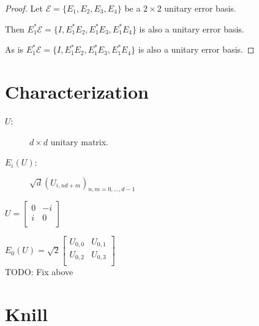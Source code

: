 \documentclass{iansnotes}
\begin{document}
\begin{proof}
  Let $\mathcal{E} = \{E_1, E_2, E_3, E_4 \}$ be a $2 \times 2$ unitary error basis.

  Then $E_1^* \mathcal{E} = \{I, E_1^* E_2, E_1^* E_3, E_1^* E_4 \}$ is also a unitary error basis. 

  As is $E_1^* \mathcal{E} = \{I, E_1^* E_2, E_1^* E_3, E_1^* E_4 \}$ is also a unitary error basis. 
\end{proof}


\section{Characterization}

\begin{description}
  \item[$U$:] $d \times d$ unitary matrix.
  \item[$E_i(U)$:] $\sqrt{d} (U_{i,nd+m})_{n,m=0,\ldots,d-1}$
\end{description}

$U = \begin{bmatrix}
  0 & -i \\
  i & 0 \\
\end{bmatrix}$

$E_0(U) = \sqrt{2} \begin{bmatrix}
  U_{0,0} & U_{0,1} \\
  U_{0,2} & U_{0,3} \\
\end{bmatrix}$\\[4mm]
TODO: Fix above

\section{Knill}
\end{document}
